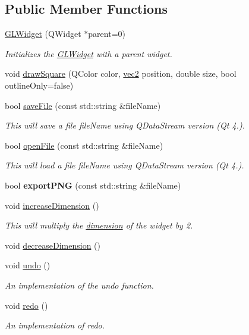 \subsection*{Public Member Functions}
\begin{DoxyCompactItemize}
\item 
\hyperlink{classGLWidget_ab79c391c86de1ffb76f6950b49d82c0c}{G\-L\-Widget} (Q\-Widget $\ast$parent=0)
\begin{DoxyCompactList}\small\item\em Initializes the \hyperlink{classGLWidget}{G\-L\-Widget} with a parent widget. \end{DoxyCompactList}\item 
void \hyperlink{classGLWidget_a6e0dab354b3abec59774c29f82346ebe}{draw\-Square} (Q\-Color color, \hyperlink{classvec2}{vec2} position, double size, bool outline\-Only=false)
\item 
bool \hyperlink{classGLWidget_aebdd7462523ecff734ac224031ec9e0b}{save\-File} (const std\-::string \&file\-Name)
\begin{DoxyCompactList}\small\item\em This will save a file {\ttfamily file\-Name} using Q\-Data\-Stream version (Qt 4.). \end{DoxyCompactList}\item 
bool \hyperlink{classGLWidget_a7c2c4eee95553aad627843b865d3bc23}{open\-File} (const std\-::string \&file\-Name)
\begin{DoxyCompactList}\small\item\em This will load a file {\ttfamily file\-Name} using Q\-Data\-Stream version (Qt 4.). \end{DoxyCompactList}\item 
\hypertarget{classGLWidget_ac84f7199c7f5b1f862055ee0d0967926}{bool {\bfseries export\-P\-N\-G} (const std\-::string \&file\-Name)}\label{classGLWidget_ac84f7199c7f5b1f862055ee0d0967926}

\item 
void \hyperlink{classGLWidget_a603764586aa51ed3fbdd06ac9c658e6b}{increase\-Dimension} ()
\begin{DoxyCompactList}\small\item\em This will multiply the \hyperlink{classGLWidget_a0ecdf8ea93e62ab9d294714e59dafd64}{dimension} of the widget by 2. \end{DoxyCompactList}\item 
void \hyperlink{classGLWidget_a34c77d5e886569ec84123bb0da5a0751}{decrease\-Dimension} ()
\item 
void \hyperlink{classGLWidget_aed44b9ce42449cf8f086a743bbbac7cd}{undo} ()
\begin{DoxyCompactList}\small\item\em An implementation of the undo function. \end{DoxyCompactList}\item 
void \hyperlink{classGLWidget_a5371a80ec723e710374f302611710e15}{redo} ()
\begin{DoxyCompactList}\small\item\em An implementation of redo. \end{DoxyCompactList}\end{DoxyCompactItemize}
